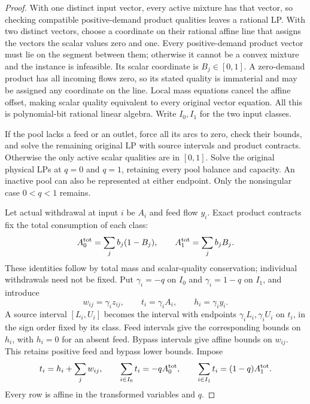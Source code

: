 \begin{proof}
With one distinct input vector, every active mixture has that vector,
so checking compatible positive-demand product qualities leaves a
rational LP. With two distinct vectors, choose a coordinate on their
rational affine line that assigns the vectors the scalar values zero
and one. Every positive-demand product vector must lie on the segment
between them; otherwise it cannot be a convex mixture and the instance
is infeasible. Its scalar coordinate is $B_j\in[0,1]$. A zero-demand
product has all incoming flows zero, so its stated quality is immaterial
and may be assigned any coordinate on the line. Local mass equations
cancel the affine offset, making scalar quality equivalent to every
original vector equation. All this is polynomial-bit rational linear
algebra. Write $I_0,I_1$ for the two input classes.

If the pool lacks a feed or an outlet, force all its arcs to zero,
check their bounds, and solve the remaining original LP with source
intervals and product contracts. Otherwise the only active scalar
qualities are in $[0,1]$. Solve the original physical LPs at $q=0$ and
$q=1$, retaining every pool balance and capacity. An inactive pool can
also be represented at either endpoint. Only the nonsingular case
$0<q<1$ remains.

Let actual withdrawal at input $i$ be $A_i$ and feed flow $y_i$.
Exact product contracts fix the total consumption of each class:
\begin{equation}
 A_0^{\rm tot}=\sum_jb_j(1-B_j),\qquad
 A_1^{\rm tot}=\sum_jb_jB_j.
 \label{s5:class-totals}
\end{equation}
These identities follow by total mass and scalar-quality conservation;
individual withdrawals need not be fixed. Put $\gamma_i=-q$ on $I_0$
and $\gamma_i=1-q$ on $I_1$, and introduce
\begin{equation}
 w_{ij}=\gamma_i z_{ij},\qquad t_i=\gamma_i A_i,
 \qquad h_i=\gamma_i y_i.
 \label{s5:two-scaling}
\end{equation}
A source interval $[L_i,U_i]$ becomes the interval with endpoints
$\gamma_iL_i,\gamma_iU_i$ on $t_i$, in the sign order fixed by its
class. Feed intervals give the corresponding bounds on $h_i$, with
$h_i=0$ for an absent feed. Bypass intervals give affine bounds on
$w_{ij}$. This retains positive feed and bypass lower bounds. Impose
\begin{equation}
 t_i=h_i+\sum_jw_{ij},\qquad
 \sum_{i\in I_0}t_i=-q A_0^{\rm tot},\qquad
 \sum_{i\in I_1}t_i=(1-q)A_1^{\rm tot}.
 \label{s5:two-input-rows}
\end{equation}
Every row is affine in the transformed variables and $q$.


\end{proof}
